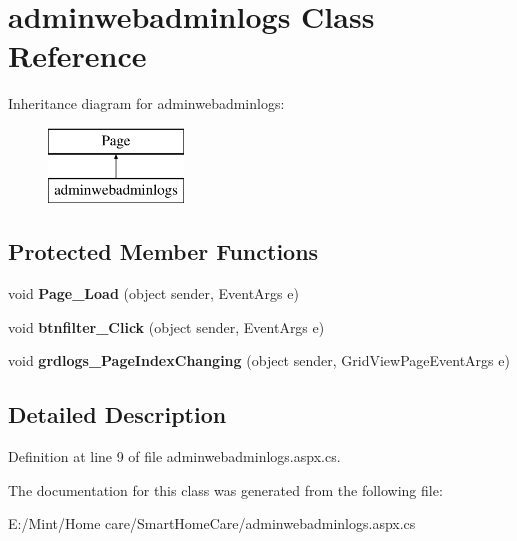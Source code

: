 \hypertarget{classadminwebadminlogs}{\section{adminwebadminlogs Class Reference}
\label{classadminwebadminlogs}
}
Inheritance diagram for adminwebadminlogs\-:\begin{figure}[H]
\begin{center}
\leavevmode
\includegraphics[height=2.000000cm]{classadminwebadminlogs}
\end{center}
\end{figure}
\subsection*{Protected Member Functions}
\begin{DoxyCompactItemize}
\item 
\hypertarget{classadminwebadminlogs_a112e47a92cea5703bcde8e53139034e8}{void {\bfseries Page\-\_\-\-Load} (object sender, Event\-Args e)}\label{classadminwebadminlogs_a112e47a92cea5703bcde8e53139034e8}

\item 
\hypertarget{classadminwebadminlogs_a686168f5aa0131e551a6d0cacf492e14}{void {\bfseries btnfilter\-\_\-\-Click} (object sender, Event\-Args e)}\label{classadminwebadminlogs_a686168f5aa0131e551a6d0cacf492e14}

\item 
\hypertarget{classadminwebadminlogs_a882bf3b005138152ef98e80d06c6641b}{void {\bfseries grdlogs\-\_\-\-Page\-Index\-Changing} (object sender, Grid\-View\-Page\-Event\-Args e)}\label{classadminwebadminlogs_a882bf3b005138152ef98e80d06c6641b}

\end{DoxyCompactItemize}


\subsection{Detailed Description}


Definition at line 9 of file adminwebadminlogs.\-aspx.\-cs.



The documentation for this class was generated from the following file\-:\begin{DoxyCompactItemize}
\item 
E\-:/\-Mint/\-Home care/\-Smart\-Home\-Care/adminwebadminlogs.\-aspx.\-cs\end{DoxyCompactItemize}
